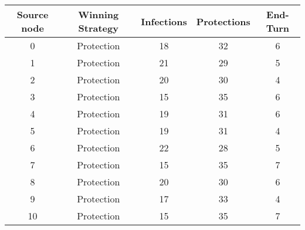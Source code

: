 \documentclass[results.tex]{subfiles}
\begin{document}
    \begin{center}
        \begin{tabular}{| c || c | c | c | c |}
            \hline
            {\bfseries Source node} & {\bfseries Winning Strategy} & {\bfseries Infections} & {\bfseries Protections}
            & {\bfseries End-Turn}
            \\  %
            \hline\hline
            0                       & Protection                   & 18                     & 32                      & 6                    \\
            \hline
            1                       & Protection                   & 21                     & 29                      & 5                    \\
            \hline
            2                       & Protection                   & 20                     & 30                      & 4                    \\
            \hline
            3                       & Protection                   & 15                     & 35                      & 6                    \\
            \hline
            4                       & Protection                   & 19                     & 31                      & 6                    \\
            \hline
            5                       & Protection                   & 19                     & 31                      & 4                    \\
            \hline
            6                       & Protection                   & 22                     & 28                      & 5                    \\
            \hline
            7                       & Protection                   & 15                     & 35                      & 7                    \\
            \hline
            8                       & Protection                   & 20                     & 30                      & 6                    \\
            \hline
            9                       & Protection                   & 17                     & 33                      & 4                    \\
            \hline
            10                      & Protection                   & 15                     & 35                      & 7                    \\

\end{tabular}
\end{center}
\end{document}
